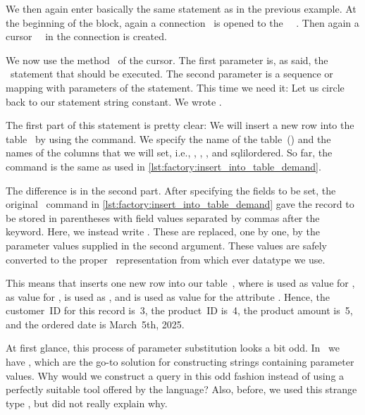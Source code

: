 We then again enter basically the same  statement as in the previous example.
At the beginning of the block, again a connection~ is opened to the \postgresql\ \dbms~\cite{VDGE2022PPDAFP:CC1}.
Then again a cursor~~\cite{VDGE2022PPDAFP:CC2} in the connection is created.
%
%
\begin{sloppypar}%
We now use the method~ of the cursor.
The first parameter is, as said, the \sql\ statement that should be executed.
The second parameter is a sequence or mapping with parameters of the statement.
This time we need it:
Let us circle back to our statement string constant.
We wrote .
\end{sloppypar}%
%
The first part of this statement is pretty clear:
We will insert a new row into the table~ by using the  command.
We specify the name of the table~() and the names of the columns that we will set, i.e., , , , and sqlil{ordered}.
So far, the command is the same as used in \cref{lst:factory:insert_into_table_demand}.

The difference is in the second part.
After specifying the fields to be set, the original \sql\ command in \cref{lst:factory:insert_into_table_demand} gave the record to be stored in parentheses with field values separated by commas after the  keyword.
Here, we instead write .
These  are replaced, one by one, by the parameter values supplied in the second argument.
These values are safely converted to the proper \sql\ representation from which ever datatype we use.%
%
\begin{sloppypar}%
This means that  inserts one new row into our table~, where  is used as value for ,  as value for ,  is used as , and  is used as value for the attribute .
Hence, the customer~ID for this record is~3, the product~ID is~4, the product amount is~5, and the ordered date is March~5th, 2025.%
\end{sloppypar}%
\endhsection%
%
%
At first glance, this process of parameter substitution looks a bit odd.
In \python\ we have , which are the go-to solution for constructing strings containing parameter values.
Why would we construct a query in this odd fashion instead of using a perfectly suitable tool offered by the language?
Also, before, we used this strange type , but did not really explain why.

